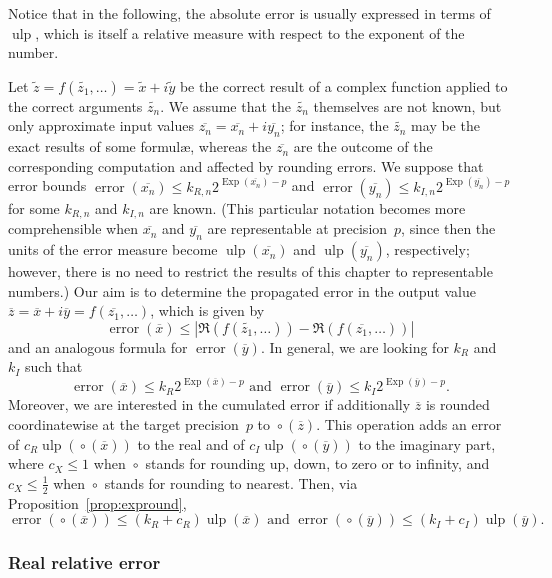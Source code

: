 \documentclass {article}
\newcommand {\corr}[1]{\widetilde {#1}}
\newcommand {\appro}[1]{\overline {#1}}
\newcommand {\Ulp}{{\operatorname {ulp}}}
\DeclareMathOperator{\Exp}{\operatorname {Exp}}
\newcommand{\error}{\operatorname {error}}
\newcommand {\round}{\operatorname {\circ}}
\renewcommand {\leq}{\leqslant}
\begin{document}
Notice that in the following, the absolute error is usually expressed in terms
of $\Ulp$, which is itself a relative measure with respect to the exponent of
the number.

Let $\corr z = f (\corr {z_1}, \ldots) = \corr x + i \corr y$ be the correct
result of a complex function applied to the correct arguments $\corr {z_n}$.
We assume that the $\corr {z_n}$ themselves are not known, but only
approximate input values $\appro {z_n} = \appro {x_n} + i \appro {y_n}$;
for instance, the $\corr {z_n}$ may be the exact results of some formul\ae,
whereas the $\appro {z_n}$ are the outcome of the corresponding computation
and affected by rounding errors. We suppose that error bounds
$\error (\appro {x_n}) \leq k_{R, n} 2^{\Exp (\appro {x_n}) - p}$
and $\error (\appro {y_n}) \leq k_{I, n} 2^{\Exp (\appro {y_n}) - p}$ for
some $k_{R, n}$ and $k_{I, n}$ are known. (This particular notation
becomes more comprehensible when $\appro {x_n}$ and $\appro {y_n}$ are
representable at precision~$p$, since then the units of the error measure
become $\Ulp (\appro {x_n})$ and $\Ulp (\appro {y_n})$, respectively;
however, there is no need to restrict the results of this chapter to
representable numbers.)
Our aim is to determine the propagated error in the output value
$\appro z = \appro x + i \appro y = f (\appro {z_1}, \ldots)$, which is given by
\begin {equation}
\label {eq:properror}
\error (\appro x)
\leq | \Re (f (\corr {z_1}, \ldots)) - \Re (f (\appro {z_1}, \ldots)) |
\end {equation}
and an analogous formula for $\error (\appro y)$. In general,
we are looking for $k_R$ and $k_I$ such that
\[
\error (\appro x) \leq k_R 2^{\Exp (\appro x) - p}
\text { and }
\error (\appro y) \leq k_I 2^{\Exp (\appro y) - p}.
\]
Moreover, we are interested in the cumulated error if additionally
$\appro z$ is rounded coordinatewise at the target precision~$p$
to $\round (\appro z)$. This operation adds an error of
$c_R \Ulp (\round (\appro x))$ to the real and of
$c_I \Ulp (\round (\appro y))$ to the imaginary part, where
$c_X \leq 1$ when $\round$ stands for rounding up, down, to zero or
to infinity, and $c_X \leq \frac {1}{2}$ when $\round$ stands for
rounding to nearest.
Then, via Proposition~\ref {prop:expround},
\[
\error (\round (\appro x)) \leq (k_R + c_R) \Ulp (\appro x)
\text { and }
\error (\round (\appro y)) \leq (k_I + c_I) \Ulp (\appro y).
\]


\subsubsection {Real relative error}
\end{document}
